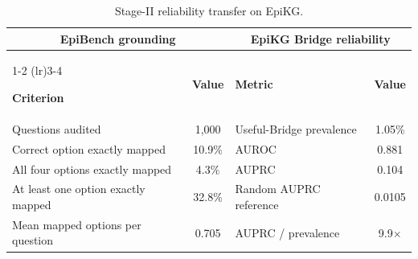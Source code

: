 \documentclass{article} %
\begin{document}
\vspace{-0.25em}

\begin{table}[!t]
\centering
\caption{Stage-II reliability transfer on EpiKG.}
\label{tab:epikg}

\vspace{-0.65em}

\footnotesize
\setlength{\tabcolsep}{3.8pt}
\renewcommand{\arraystretch}{0.88}

\begin{tabular*}{\textwidth}{
@{\extracolsep{\fill}}
lc
lc
@{}
}
\toprule

\multicolumn{2}{c}{\textbf{EpiBench grounding}}
&
\multicolumn{2}{c}{\textbf{EpiKG Bridge reliability}}
\\[-0.18em]

\cmidrule(lr){1-2}
\cmidrule(lr){3-4}

\textbf{Criterion}
& \textbf{Value}
& \textbf{Metric}
& \textbf{Value}
\\[-0.12em]

\midrule

Questions audited
& 1,000
& Useful-Bridge prevalence
& 1.05\%
\\[-0.10em]

Correct option exactly mapped
& 10.9\%
& AUROC
& 0.881
\\[-0.10em]

All four options exactly mapped
& 4.3\%
& AUPRC
& 0.104
\\[-0.10em]

At least one option exactly mapped
& 32.8\%
& Random AUPRC reference
& 0.0105
\\[-0.10em]

Mean mapped options per question
& 0.705
& AUPRC / prevalence
& 9.9$\times$
\\[-0.05em]

\bottomrule
\end{tabular*}

\vspace{-0.65em}
\end{table}

\vspace{-0.35em}
\end{document}
